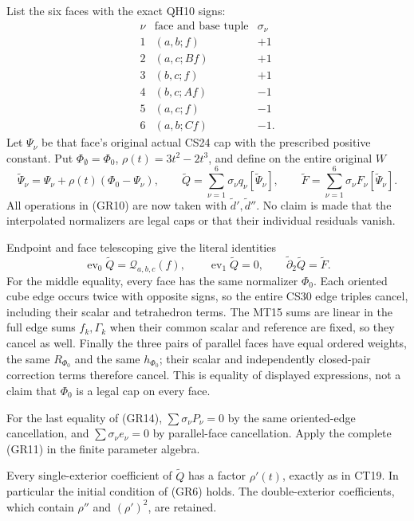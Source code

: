 List the six faces with the exact QH10 signs:
\[
 \begin{array}{c|c|c}
 \nu&\text{face and base tuple}&\sigma_\nu\\\hline
 1&(a,b;f)&+1\\
 2&(a,c;Bf)&+1\\
 3&(b,c;f)&+1\\
 4&(b,c;Af)&-1\\
 5&(a,c;f)&-1\\
 6&(a,b;Cf)&-1.
 \end{array}
 \tag{GR12}
\]
Let $\Psi_\nu$ be that face's original actual CS24 cap with the
prescribed positive constant.  Put $\Phi_\emptyset=\Phi_0$,
$\rho(t)=3t^2-2t^3$, and define on the entire original $W$
\[
 \widetilde\Psi_\nu
     =\Psi_\nu+\rho(t)(\Phi_0-\Psi_\nu),\qquad
 \widetilde Q=\sum_{\nu=1}^6\sigma_\nu q_\nu[\widetilde\Psi_\nu],
 \qquad
 \widetilde F=\sum_{\nu=1}^6\sigma_\nu F_\nu[\widetilde\Psi_\nu].
 \tag{GR13}
\]
All operations in (GR10) are now taken with $\widetilde d',
\widetilde d''$.  No claim is made that the interpolated normalizers
are legal caps or that their individual residuals vanish.

Endpoint and face telescoping give the literal identities
\[
 \operatorname{ev}_0\widetilde Q=\mathcal Q_{a,b,c}(f),\qquad
 \operatorname{ev}_1\widetilde Q=0,\qquad
                 \widetilde\partial_2\widetilde Q=\widetilde F.
 \tag{GR14}
\]
For the middle equality, every face has the same normalizer $\Phi_0$.
Each oriented cube edge occurs twice with opposite signs, so the
entire CS30 edge triples cancel, including their scalar and
tetrahedron terms.  The MT15 sums are linear in the full edge
sums $f_k,\Gamma_k$ when their common scalar and reference are fixed,
so they cancel as well.  Finally the three pairs of parallel faces
have equal ordered weights, the same $R_{\Phi_0}$ and the same
$h_{\Phi_0}$; their scalar and independently closed-pair correction
terms therefore cancel.  This is equality of displayed expressions,
not a claim that $\Phi_0$ is a legal cap on every face.

For the last equality of (GR14), $\sum\sigma_\nu P_\nu=0$ by
the same oriented-edge cancellation, and
$\sum\sigma_\nu e_\nu=0$ by parallel-face cancellation.  Apply
the complete (GR11) in the finite parameter algebra.

Every single-exterior coefficient of $\widetilde Q$ has a factor
$\rho'(t)$, exactly as in CT19.  In particular the initial condition
of (GR6) holds.  The double-exterior coefficients, which contain
$\rho''$ and $(\rho')^2$, are retained.

